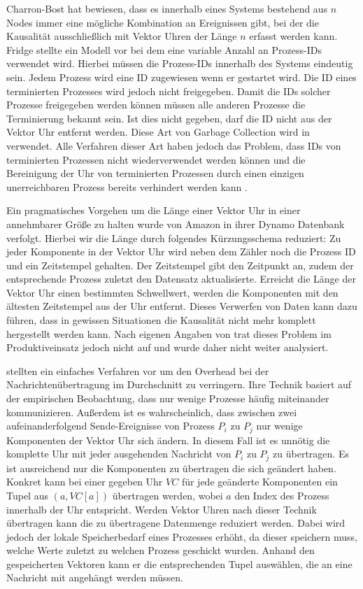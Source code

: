 Charron-Bost \cite{charron1990concerning} hat bewiesen, dass es innerhalb eines Systems bestehend aus $n$ Nodes immer eine mögliche Kombination an Ereignissen gibt, bei der die Kausalität ausschließlich mit Vektor Uhren der Länge $n$ erfasst werden kann.
Fridge \cite{fidge1991logical} stellte ein Modell vor bei dem eine variable Anzahl an Prozess-IDs verwendet wird.
Hierbei müssen die Prozess-IDs innerhalb des Systems eindeutig sein.
Jedem Prozess wird eine ID zugewiesen wenn er gestartet wird.
Die ID eines terminierten Prozesses wird jedoch nicht freigegeben.
Damit die IDs solcher Prozesse freigegeben werden können müssen alle anderen Prozesse die Terminierung bekannt sein.
Ist dies nicht gegeben, darf die ID nicht aus der Vektor Uhr entfernt werden.
Diese Art von Garbage Collection wird in \cite{richard1998efficient} verwendet.
Alle Verfahren dieser Art haben jedoch das Problem, dass IDs von terminierten Prozessen nicht wiederverwendet werden können und die Bereinigung der Uhr von terminierten Prozessen durch einen einzigen unerreichbaren Prozess bereits verhindert werden kann \cite{almeida2008treeclocks}.

Ein pragmatisches Vorgehen um die Länge einer Vektor Uhr in einer annehmbarer Größe zu halten wurde von Amazon in ihrer Dynamo Datenbank \cite{decandia2007dynamo} verfolgt.
Hierbei wir die Länge durch folgendes Kürzungsschema reduziert:
Zu jeder Komponente in der Vektor Uhr wird neben dem Zähler noch die Prozess ID und ein Zeitstempel gehalten.
Der Zeitstempel gibt den Zeitpunkt an, zudem der entsprechende Prozess zuletzt den Datensatz aktualisierte.
Erreicht die Länge der Vektor Uhr einen bestimmten Schwellwert, werden die Komponenten mit den ältesten Zeitstempel aus der Uhr entfernt.
Dieses Verwerfen von Daten kann dazu führen, dass in gewissen Situationen die Kausalität nicht mehr komplett hergestellt werden kann.
Nach eigenen Angaben von  \cite{decandia2007dynamo} trat dieses Problem im Produktiveinsatz jedoch nicht auf und wurde daher nicht weiter analysiert.

 \cite{singhal1992efficient} stellten ein einfaches Verfahren vor um den Overhead bei der Nachrichtenübertragung im Durchschnitt zu verringern.
Ihre Technik basiert auf der empirischen Beobachtung, dass nur wenige Prozesse häufig miteinander kommunizieren.
Außerdem ist es wahrscheinlich, dass zwischen zwei aufeinanderfolgend Sende-Ereignisse von Prozess $P_i$ zu $P_j$ nur wenige Komponenten der Vektor Uhr sich ändern.
In diesem Fall ist es unnötig die komplette Uhr mit jeder ausgehenden Nachricht von $P_i$ zu $P_j$ zu übertragen.
Es ist ausreichend nur die Komponenten zu übertragen die sich geändert haben.
Konkret kann bei einer gegeben Uhr $VC$ für jede geänderte Komponenten ein Tupel aus $(a, VC[a])$ übertragen werden, wobei $a$ den Index des Prozess innerhalb der Uhr entspricht.
Werden Vektor Uhren nach dieser Technik übertragen kann die zu übertragene Datenmenge reduziert werden.
Dabei wird jedoch der lokale Speicherbedarf eines Prozesses erhöht, da dieser speichern muss, welche Werte zuletzt zu welchen Prozess geschickt wurden.
Anhand den gespeicherten Vektoren kann er die entsprechenden Tupel auswählen, die an eine Nachricht mit angehängt werden müssen.

